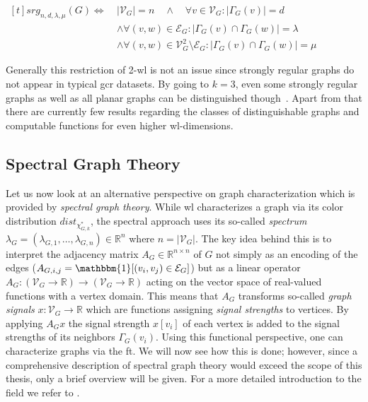 \begin{defn}
	$\begin{aligned}[t]
		\mathit{srg}_{n, d, \lambda, \mu}(G) \iff\ & {|\mathcal{V}_G|} = n \quad\land\quad \forall v \in \mathcal{V}_G: {|\Gamma_G(v)|} = d \\
		&\land \forall (v, w) \in \mathcal{E}_G: {|\Gamma_G(v) \cap \Gamma_G(w)|} = \lambda \\
		&\land \forall (v, w) \in \mathcal{V}_G^2 \setminus \mathcal{E}_G: {|\Gamma_G(v) \cap \Gamma_G(w)|} = \mu
	\end{aligned}$
\end{defn}
Generally this restriction of 2-\acs{wl} is not an issue since strongly regular graphs do not appear in typical \ac{gcr} datasets.
By going to $k = 3$, even some strongly regular graphs as well as all planar graphs can be distinguished though~\cite{Kiefer2017}.
Apart from that there are currently few results regarding the classes of distinguishable graphs and computable functions for even higher \ac{wl}-dimensions.

\subsection{Spectral Graph Theory}%
\label{sec:related:character:spectral}

Let us now look at an alternative perspective on graph characterization which is provided by \textit{spectral graph theory}.
While \ac{wl} characterizes a graph via its color distribution $\mathit{dist}_{\chi_{G,k}^{*}}$, the spectral approach uses its so-called \textit{spectrum} $\lambda_G = (\lambda_{G, 1}, \dots, \lambda_{G, n}) \in \mathbb{R}^n$ where $n = |\mathcal{V}_G|$.
The key idea behind this is to interpret the adjacency matrix $A_G \in \mathbb{R}^{n \times n}$ of $G$ not simply as an encoding of the edges ($A_{G,i,j} = \mathbbm{1}[(v_i, v_j) \in \mathcal{E}_G]$) but as a linear operator $A_G: (\mathcal{V}_G \to \mathbb{R}) \to (\mathcal{V}_G \to \mathbb{R})$ acting on the vector space of real-valued functions with a vertex domain.
This means that $A_G$ transforms so-called \textit{graph signals} $x: \mathcal{V}_G \to \mathbb{R}$ which are functions assigning \textit{signal strengths} to vertices.
By applying $A_G x$ the signal strength $x[v_i]$ of each vertex is added to the signal strengths of its neighbors $\Gamma_G(v_i)$.
Using this functional perspective, one can characterize graphs via the \acf{ft}.
We will now see how this is done;
however, since a comprehensive description of spectral graph theory would exceed the scope of this thesis, only a brief overview will be given.
For a more detailed introduction to the field we refer to \citet{Shuman2013}.

